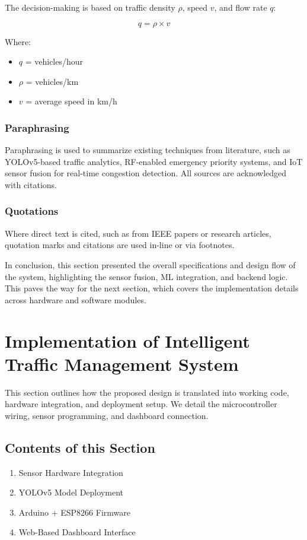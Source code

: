 \documentclass[12pt]{report}
\begin{document}
The decision-making is based on traffic density $\rho$, speed $v$, and flow rate $q$:

\begin{equation}
q = \rho \times v
\end{equation}

Where:
\begin{itemize}
\item $q$ = vehicles/hour
\item $\rho$ = vehicles/km
\item $v$ = average speed in km/h
\end{itemize}

\subsection{Paraphrasing}
Paraphrasing is used to summarize existing techniques from literature, such as YOLOv5-based traffic analytics, RF-enabled emergency priority systems, and IoT sensor fusion for real-time congestion detection. All sources are acknowledged with citations.

\subsection{Quotations}
Where direct text is cited, such as from IEEE papers or research articles, quotation marks and citations are used in-line or via footnotes.

\vspace{0.5cm}

In conclusion, this section presented the overall specifications and design flow of the system, highlighting the sensor fusion, ML integration, and backend logic. This paves the way for the next section, which covers the implementation details across hardware and software modules.

\chapter{Implementation of Intelligent Traffic Management System}

This section outlines how the proposed design is translated into working code, hardware integration, and deployment setup. We detail the microcontroller wiring, sensor programming, and dashboard connection.

\section{Contents of this Section}
\begin{enumerate}
\item Sensor Hardware Integration
\item YOLOv5 Model Deployment
\item Arduino + ESP8266 Firmware
\item Web-Based Dashboard Interface
\end{enumerate}
\end{document}
